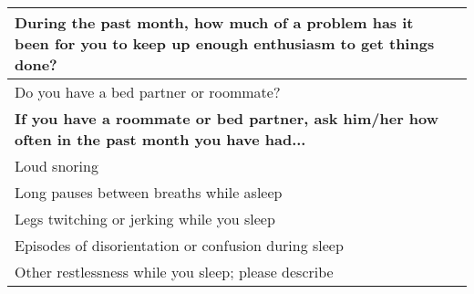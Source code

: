 \begin{table}[H]
\begin{tabularx}{\textwidth}{|X|l|}
        During the past month, how much of a problem has it been for you to keep up enough enthusiasm to get things done? &  \\ \hline
        Do you have a bed partner or roommate? &  \\ \hline
        \textbf{If you have a roommate or bed partner, ask him/her how often in the past month you have had...} & \\ \hline
        \quad Loud snoring &  \\ \hline
        \quad Long pauses between breaths while asleep &  \\ \hline
        \quad Legs twitching or jerking while you sleep &  \\ \hline
        \quad Episodes of disorientation or confusion during sleep &  \\ \hline
        \quad Other restlessness while you sleep; please describe &  \\ \hline
    \end{tabularx}
\end{table}

